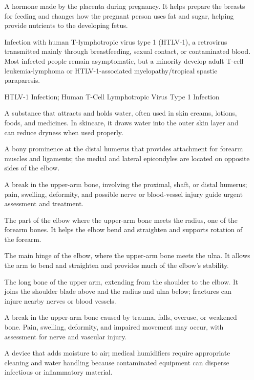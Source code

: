  A hormone made by the placenta during pregnancy. It helps prepare the breasts for feeding and changes how the pregnant person uses fat and sugar, helping provide nutrients to the developing fetus.

 Infection with human T-lymphotropic virus type 1 (HTLV-1), a retrovirus transmitted mainly through breastfeeding, sexual contact, or contaminated blood. Most infected people remain asymptomatic, but a minority develop adult T-cell leukemia-lymphoma or HTLV-1-associated myelopathy/tropical spastic paraparesis.

\synonyms
HTLV-1 Infection; Human T-Cell Lymphotropic Virus Type 1 Infection

 A substance that attracts and holds water, often used in skin creams, lotions, foods, and medicines. In skincare, it draws water into the outer skin layer and can reduce dryness when used properly.

 A bony prominence at the distal humerus that provides attachment for forearm muscles and ligaments; the medial and lateral epicondyles are located on opposite sides of the elbow.

 A break in the upper-arm bone, involving the proximal, shaft, or distal humerus; pain, swelling, deformity, and possible nerve or blood-vessel injury guide urgent assessment and treatment.

 The part of the elbow where the upper-arm bone meets the radius, one of the forearm bones. It helps the elbow bend and straighten and supports rotation of the forearm.

 The main hinge of the elbow, where the upper-arm bone meets the ulna. It allows the arm to bend and straighten and provides much of the elbow’s stability.

 The long bone of the upper arm, extending from the shoulder to the elbow. It joins the shoulder blade above and the radius and ulna below; fractures can injure nearby nerves or blood vessels.

 A break in the upper-arm bone caused by trauma, falls, overuse, or weakened bone. Pain, swelling, deformity, and impaired movement may occur, with assessment for nerve and vascular injury.

 A device that adds moisture to air; medical humidifiers require appropriate cleaning and water handling because contaminated equipment can disperse infectious or inflammatory material.

